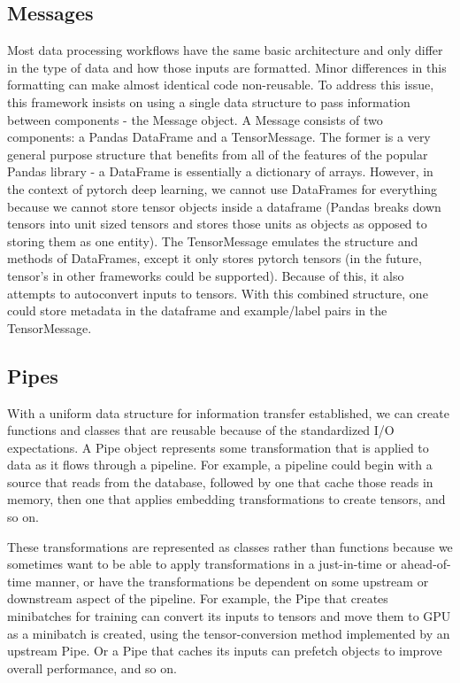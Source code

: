 \documentclass[letterpaper,10pt,english]{sphinxmanual}
\begin{document}
\subsection{Messages}
\label{\detokenize{Fireworks:messages}}
Most data processing workflows have the same basic architecture and only differ in the type of data and how those inputs are formatted. Minor differences in this formatting can make almost identical code non-reusable. To address this issue, this framework insists on using a single data structure to pass information between components - the Message object.
A Message consists of two components: a Pandas DataFrame and a TensorMessage. The former is a very general purpose structure that benefits from all of the features of the popular Pandas library - a DataFrame is essentially a dictionary of arrays. However, in the context of pytorch deep learning, we cannot use DataFrames for everything because we cannot store tensor objects inside a dataframe (Pandas breaks down tensors into unit sized tensors and stores those units as objects as opposed to storing them as one entity). The TensorMessage emulates the structure and methods of DataFrames, except it only stores pytorch tensors (in the future, tensor’s in other frameworks could be supported). Because of this, it also attempts to autoconvert inputs to tensors. With this combined structure, one could store metadata in the dataframe and example/label pairs in the TensorMessage.


\subsection{Pipes}
\label{\detokenize{Fireworks:pipes}}
With a uniform data structure for information transfer established, we can create functions and classes that are reusable because of the standardized I/O expectations. A Pipe object represents some transformation that is applied to data as it flows through a pipeline. For example, a pipeline could begin with a source that reads from the database, followed by one that cache those reads in memory, then one that applies embedding transformations to create tensors, and so on.

These transformations are represented as classes rather than functions because we sometimes want to be able to apply transformations in a just-in-time or ahead-of-time manner, or have the transformations be dependent on some upstream or downstream aspect of the pipeline. For example, the Pipe that creates minibatches for training can convert its inputs to tensors and move them to GPU as a minibatch is created, using the tensor-conversion method implemented by an upstream Pipe. Or a Pipe that caches its inputs can prefetch objects to improve overall performance, and so on.
\end{document}
